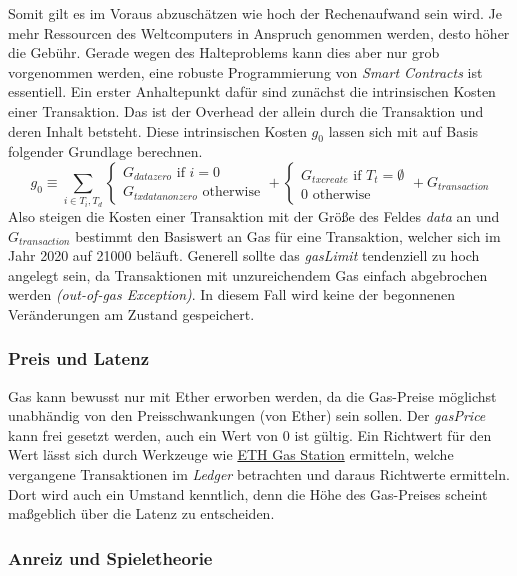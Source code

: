 \documentclass[runningheads]{llncs}
\begin{document}
Somit gilt es im Voraus abzuschätzen wie hoch der Rechenaufwand sein wird. Je mehr Ressourcen des Weltcomputers in Anspruch genommen werden, desto höher die Gebühr. Gerade wegen des Halteproblems kann dies aber nur grob vorgenommen werden, eine robuste Programmierung von \textit{Smart Contracts} ist essentiell. Ein erster Anhaltepunkt dafür sind zunächst die intrinsischen Kosten einer Transaktion. Das ist der Overhead der allein durch die Transaktion und deren Inhalt betsteht. Diese intrinsischen Kosten $ g_0 $ lassen sich mit auf Basis folgender Grundlage berechnen.
$$ g_0 \equiv \sum_{i \in T_i, T_d}
  \begin{cases}
    G_{datazero} \text{ if } i=0 \\
    G_{txdatanonzero} \text{ otherwise}
  \end{cases}
  +
  \begin{cases}
    G_{txcreate} \text{ if } T_t = \emptyset \\
    0 \text{ otherwise}
  \end{cases}
  +
  G_{transaction}
$$
Also steigen die Kosten einer Transaktion mit der Größe des Feldes \textit{data} an und $ G_{transaction} $ bestimmt den Basiswert an Gas für eine Transaktion, welcher sich im Jahr 2020 auf 21000 beläuft. Generell sollte das \textit{gasLimit} tendenziell zu hoch angelegt sein, da Transaktionen mit unzureichendem Gas einfach abgebrochen werden \textit{(out-of-gas Exception)}. In diesem Fall wird keine der begonnenen Veränderungen am Zustand gespeichert.

\subsubsection{Preis und Latenz}
Gas kann bewusst nur mit Ether erworben werden, da die Gas-Preise möglichst unabhändig von den Preisschwankungen (von Ether) sein sollen. Der \textit{gasPrice} kann frei gesetzt werden, auch ein Wert von 0 ist gültig. Ein Richtwert für den Wert lässt sich durch Werkzeuge wie \href{https://www.ethgasstation.info/}{ETH Gas Station} ermitteln, welche vergangene Transaktionen im \textit{Ledger} betrachten und daraus Richtwerte ermitteln. Dort wird auch ein Umstand kenntlich, denn die Höhe des Gas-Preises scheint maßgeblich über die Latenz zu entscheiden. 
\cite[S. 7]{wood_ethereum/yellowpaper_2019}
\subsubsection{Anreiz und Spieletheorie}
\end{document}
